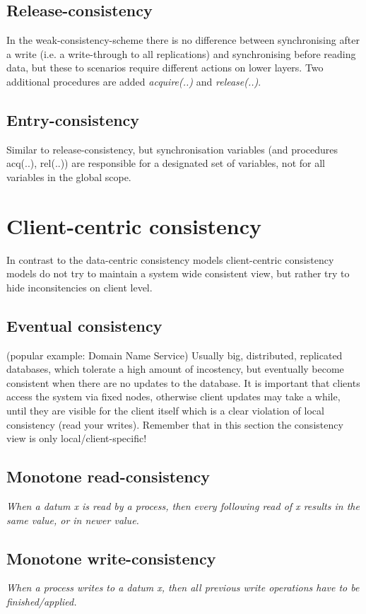 \subsection{Release-consistency}
In the weak-consistency-scheme there is no difference between synchronising after a write (i.e. a write-through to all replications) and synchronising before reading data, but these to scenarios require different actions on lower layers.
Two additional procedures are added \emph{acquire(..)} and \emph{release(..)}.

\subsection{Entry-consistency}
Similar to release-consistency, but synchronisation variables (and procedures acq(..), rel(..)) are responsible for a designated set of variables, not for all variables in the global scope.

\section{Client-centric consistency}
In contrast to the data-centric consistency models client-centric consistency models do not try to maintain a system wide consistent view, but rather try to hide inconsitencies on client level.

\subsection{Eventual consistency}
(popular example: Domain Name Service)
Usually big, distributed, replicated databases, which tolerate a high amount of incostency, but eventually become consistent when there are no updates to the database.
It is important that clients access the system via fixed nodes, otherwise client updates may take a while, until they are visible for the client itself which is a clear violation of local consistency (read your writes).
Remember that in this section the consistency view is only local/client-specific!

\subsection{Monotone read-consistency}
\emph{When a datum x is read by a process, then every following read of x results in the same value, or in newer value.}

\subsection{Monotone write-consistency}
\emph{When a process writes to a datum x, then all previous write operations have to be finished/applied.}

